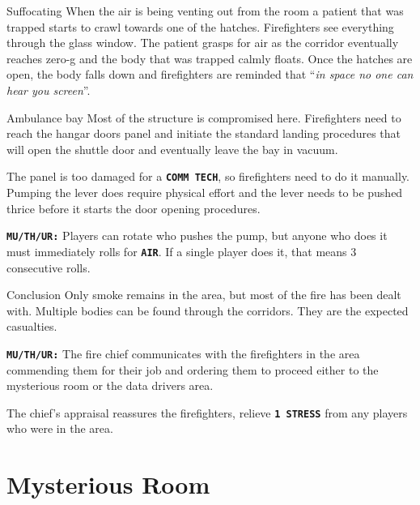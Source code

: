 \begin{rpg-warnbox}{Suffocating}
    When the air is being venting out from the room a patient that was trapped starts to crawl towards one of the hatches. Firefighters see everything through the glass window. The patient grasps for air as the corridor eventually reaches zero-g and the body that was trapped calmly floats. Once the hatches are open, the body falls down and firefighters are reminded that ``\textit{in space no one can hear you screen}''.
\end{rpg-warnbox}
  



\begin{rpg-commentbox}{Ambulance bay}
    Most of the structure is compromised here. Firefighters need to reach the hangar doors panel and initiate the standard landing procedures that will open the shuttle door and eventually leave the bay in vacuum. 

    The panel is too damaged for a \texttt{\textbf{COMM TECH}}, so firefighters need to do it manually. Pumping the lever does require  physical effort and the lever needs to be pushed thrice before it starts the door opening procedures. 

    \texttt{\textbf{MU/TH/UR:}} Players can rotate who pushes the pump, but anyone who does it must immediately rolls for \texttt{\textbf{AIR}}. If a single player does it, that means 3 consecutive rolls.
\end{rpg-commentbox}  

\newsect


\begin{rpg-commentbox}{Conclusion}
    Only smoke remains in the area, but most of the fire has been dealt with. Multiple bodies can be found through the corridors. They are the expected casualties.
    
    \texttt{\textbf{MU/TH/UR:}} The fire chief communicates with the firefighters in the area commending them for their job  and ordering them to proceed either to the mysterious room or the data drivers area. 

    The chief's appraisal reassures the firefighters, relieve \texttt{\textbf{1 STRESS}} from any players who were in the area.
\end{rpg-commentbox}  



\clearpage

\section{Mysterious Room}



